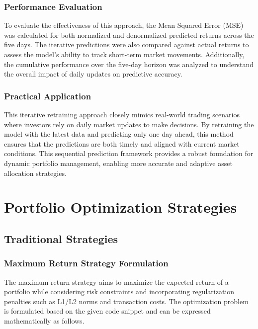 \subsubsection{Performance Evaluation}

To evaluate the effectiveness of this approach, the Mean Squared Error (MSE) was calculated for both normalized and denormalized predicted returns across the five days. The iterative predictions were also compared against actual returns to assess the model's ability to track short-term market movements. Additionally, the cumulative performance over the five-day horizon was analyzed to understand the overall impact of daily updates on predictive accuracy.

\subsubsection{Practical Application}

This iterative retraining approach closely mimics real-world trading scenarios where investors rely on daily market updates to make decisions. By retraining the model with the latest data and predicting only one day ahead, this method ensures that the predictions are both timely and aligned with current market conditions. This sequential prediction framework provides a robust foundation for dynamic portfolio management, enabling more accurate and adaptive asset allocation strategies.



\section{Portfolio Optimization Strategies}

\subsection{Traditional Strategies}
\subsubsection{Maximum Return Strategy Formulation}

The maximum return strategy aims to maximize the expected return of a portfolio while considering risk constraints and incorporating regularization penalties such as L1/L2 norms and transaction costs. The optimization problem is formulated based on the given code snippet and can be expressed mathematically as follows.

